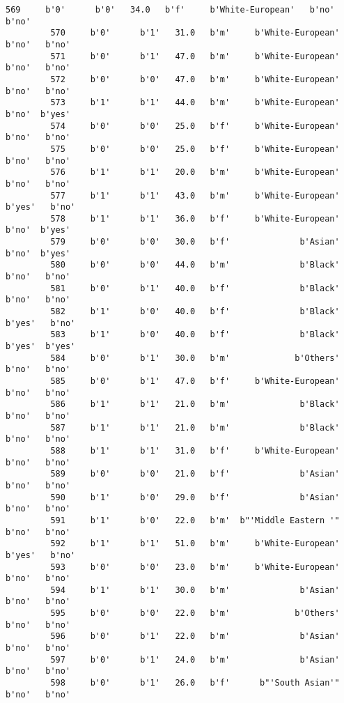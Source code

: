 \documentclass[11pt]{article}
\begin{document}
\begin{Verbatim}[commandchars=\\\{\}]
         569     b'0'      b'0'   34.0   b'f'     b'White-European'   b'no'   b'no'   
         570     b'0'      b'1'   31.0   b'm'     b'White-European'   b'no'   b'no'   
         571     b'0'      b'1'   47.0   b'm'     b'White-European'   b'no'   b'no'   
         572     b'0'      b'0'   47.0   b'm'     b'White-European'   b'no'   b'no'   
         573     b'1'      b'1'   44.0   b'm'     b'White-European'   b'no'  b'yes'   
         574     b'0'      b'0'   25.0   b'f'     b'White-European'   b'no'   b'no'   
         575     b'0'      b'0'   25.0   b'f'     b'White-European'   b'no'   b'no'   
         576     b'1'      b'1'   20.0   b'm'     b'White-European'   b'no'   b'no'   
         577     b'1'      b'1'   43.0   b'm'     b'White-European'  b'yes'   b'no'   
         578     b'1'      b'1'   36.0   b'f'     b'White-European'   b'no'  b'yes'   
         579     b'0'      b'0'   30.0   b'f'              b'Asian'   b'no'  b'yes'   
         580     b'0'      b'0'   44.0   b'm'              b'Black'   b'no'   b'no'   
         581     b'0'      b'1'   40.0   b'f'              b'Black'   b'no'   b'no'   
         582     b'1'      b'0'   40.0   b'f'              b'Black'  b'yes'   b'no'   
         583     b'1'      b'0'   40.0   b'f'              b'Black'  b'yes'  b'yes'   
         584     b'0'      b'1'   30.0   b'm'             b'Others'   b'no'   b'no'   
         585     b'0'      b'1'   47.0   b'f'     b'White-European'   b'no'   b'no'   
         586     b'1'      b'1'   21.0   b'm'              b'Black'   b'no'   b'no'   
         587     b'1'      b'1'   21.0   b'm'              b'Black'   b'no'   b'no'   
         588     b'1'      b'1'   31.0   b'f'     b'White-European'   b'no'   b'no'   
         589     b'0'      b'0'   21.0   b'f'              b'Asian'   b'no'   b'no'   
         590     b'1'      b'0'   29.0   b'f'              b'Asian'   b'no'   b'no'   
         591     b'1'      b'0'   22.0   b'm'  b"'Middle Eastern '"   b'no'   b'no'   
         592     b'1'      b'1'   51.0   b'm'     b'White-European'  b'yes'   b'no'   
         593     b'0'      b'0'   23.0   b'm'     b'White-European'   b'no'   b'no'   
         594     b'1'      b'1'   30.0   b'm'              b'Asian'   b'no'   b'no'   
         595     b'0'      b'0'   22.0   b'm'             b'Others'   b'no'   b'no'   
         596     b'0'      b'1'   22.0   b'm'              b'Asian'   b'no'   b'no'   
         597     b'0'      b'1'   24.0   b'm'              b'Asian'   b'no'   b'no'   
         598     b'0'      b'1'   26.0   b'f'      b"'South Asian'"   b'no'   b'no'   

\end{Verbatim}
\end{document}
